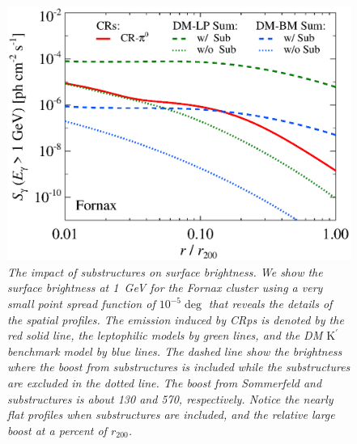 \documentclass[10pt,aps,pra,reprint,amsmath,amsfonts,amssymb,showpacs]{revtex4-1}
\newcommand{\rmn}{\mathrm}
\newcommand{\Kp}{\rmn{K}^\prime}
\newcommand{\rvir}{r_{200}}
\begin{document}
\begin{figure}%
 \includegraphics[width=0.99\columnwidth]{figures/SB.resolved.v11.1GeV.SF300.noSuB.vs.SubMass.elmu.eps}
\caption{\it The impact of substructures on surface brightness. We
  show the surface brightness at 1~GeV for the Fornax cluster using a
  very small point spread function of $10^{-5}\deg$ that reveals the
  details of the spatial profiles. The emission induced by CRps is
  denoted by the red solid line, the leptophilic models by green
  lines, and the DM $\Kp$ benchmark model by blue lines. The dashed
  line show the brightness where the boost from substructures is
  included while the substructures are excluded in the dotted
  line. The boost from Sommerfeld and substructures is about 130 and
  570, respectively. Notice the nearly flat profiles when
  substructures are included, and the relative large boost at a
  percent of $\rvir$.}
 \label{fig:SB_sub}
\end{figure}
\end{document}
